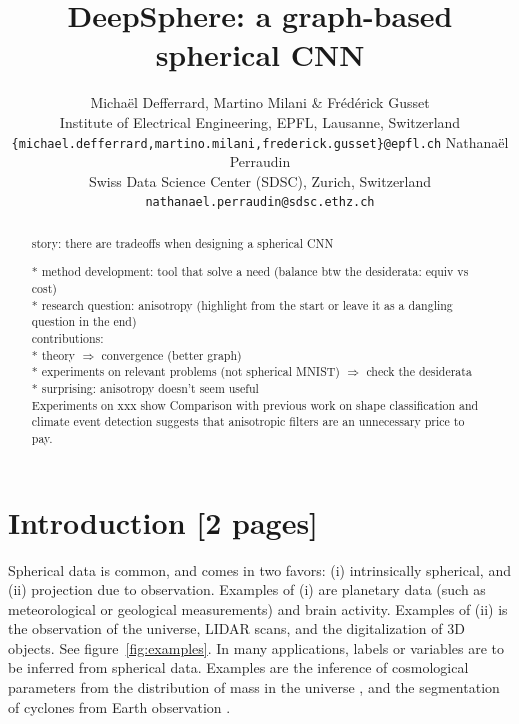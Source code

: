 \documentclass{article} %
\title{DeepSphere: a graph-based spherical CNN}
\author{Michaël Defferrard, Martino Milani \& Frédérick Gusset \\
Institute of Electrical Engineering, EPFL, Lausanne, Switzerland \\
\texttt{\{michael.defferrard,martino.milani,frederick.gusset\}@epfl.ch}
\AND
Nathanaël Perraudin \\
Swiss Data Science Center (SDSC), Zurich, Switzerland \\
\texttt{nathanael.perraudin@sdsc.ethz.ch}
}
\newcommand{\todo}[1]{{\color[rgb]{.6,.1,.6}{#1}}}
\renewcommand{\figref}[1]{figure~\ref{fig:#1}}
\begin{document}
\maketitle

\begin{abstract}

story: there are tradeoffs when designing a spherical CNN

* method development: tool that solve a need (balance btw the desiderata: equiv vs cost)\\
* research question: anisotropy (highlight from the start or leave it as a dangling question in the end)\\

contributions:\\
* theory $\Rightarrow$ convergence (better graph)\\
* experiments on relevant problems (not spherical MNIST) $\Rightarrow$ check the desiderata\\
  * surprising: anisotropy doesn't seem useful\\

Experiments on xxx show
Comparison with previous work on shape classification and climate event detection suggests that anisotropic filters are an unnecessary price to pay.

\end{abstract}

\todo{
	* adjacency matrix: $A$ instead of $W$? \\
	* anonymize DeepSphere citation \\
	* climate spherical figure: inputs with TC and AR labels superimposed \\
	* citet for inline, citep for parenthesis \\
}

\section{Introduction [2 pages]}

Spherical data is common, and comes in two favors: (i) intrinsically spherical, and (ii) projection due to observation.
Examples of (i) are planetary data (such as meteorological or geological measurements) and brain activity.
Examples of (ii) is the observation of the universe, LIDAR scans, and the digitalization of 3D objects. %
See \figref{examples}.
In many applications, labels or variables are to be inferred from spherical data.
Examples are the inference of cosmological parameters from the distribution of mass in the universe \citep{perraudin2019deepsphere}, and the segmentation of cyclones from Earth observation \citep{mudigonda2017climateevents}.
\end{document}
